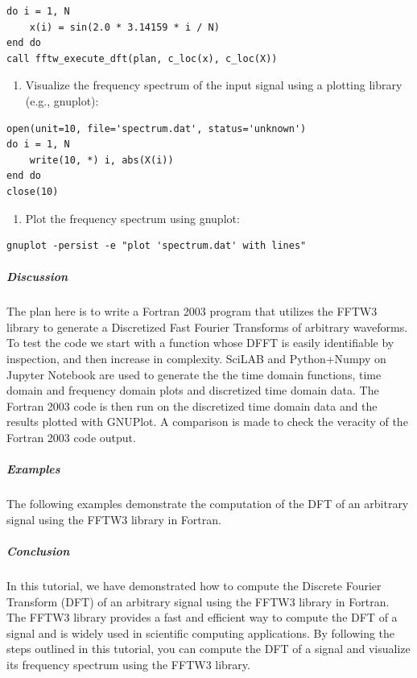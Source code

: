 \begin{verbatim}
do i = 1, N
    x(i) = sin(2.0 * 3.14159 * i / N)
end do
call fftw_execute_dft(plan, c_loc(x), c_loc(X))
\end{verbatim}

\begin{enumerate}[resume]
\item Visualize the frequency spectrum of the input signal using a plotting library (e.g., gnuplot):
\end{enumerate}

\begin{verbatim}
open(unit=10, file='spectrum.dat', status='unknown')
do i = 1, N
    write(10, *) i, abs(X(i))
end do
close(10)
\end{verbatim}

\begin{enumerate}[resume]
\item Plot the frequency spectrum using gnuplot:
\end{enumerate}

\begin{verbatim}
gnuplot -persist -e "plot 'spectrum.dat' with lines"
\end{verbatim}

\subparagraph{Discussion}

The plan here is to write a Fortran 2003 program that utilizes the FFTW3 library to generate a Discretized Fast Fourier Transforms of arbitrary waveforms. To test the code we start with a function whose DFFT is easily identifiable by inspection, and then increase in complexity. SciLAB and Python+Numpy on Jupyter Notebook are used to generate the the time domain functions, time domain and frequency domain plots and discretized time domain data. The Fortran 2003 code is then run on the discretized time domain data and the results plotted with GNUPlot. A comparison is made to check the veracity of the Fortran 2003 code output.

\subparagraph{Examples}

The following examples demonstrate the computation of the DFT of an arbitrary signal using the FFTW3 library in Fortran.

\subparagraph{Conclusion}

In this tutorial, we have demonstrated how to compute the Discrete Fourier Transform (DFT) of an arbitrary signal using the FFTW3 library in Fortran. The FFTW3 library provides a fast and efficient way to compute the DFT of a signal and is widely used in scientific computing applications. By following the steps outlined in this tutorial, you can compute the DFT of a signal and visualize its frequency spectrum using the FFTW3 library.